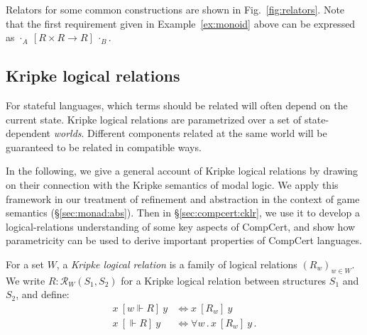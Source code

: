 \documentclass[acmsmall,timestamp,review,anonymous]{acmart}
\newcommand{\ifr}[1]{\ [{#1}]\ }
\begin{document}
Relators for some common constructions are shown in Fig.~\ref{fig:relators}.
Note that the first requirement given in Example~\ref{ex:monoid} above
can be expressed as
$
  \cdot_A \ifr{R \times R \rightarrow R} \cdot_B
$.



\subsection{Kripke logical relations} %
\label{sec:klr}

For stateful languages,
which terms should be related
will often depend on the current state.
Kripke logical relations
are parametrized over a set of state-dependent \emph{worlds}.
Different components related at the same world
will be guaranteed to be related in compatible ways.

In the following,
we give a general account of Kripke logical relations
by drawing on their connection with
the Kripke semantics of modal logic.
We apply this framework
in our treatment of refinement and abstraction
in the context of game semantics (\S\ref{sec:monad:abs}).
Then in \S\ref{sec:compcert:cklr},
we use it to develop a logical-relations
understanding of some key aspects of CompCert,
and show how parametricity
can be used to derive important properties
of CompCert languages.

\begin{definition}
For a set $W$,
a \emph{Kripke logical relation} is
a family of logical relations $(R_w)_{w \in W}$.
We write $R : \mathcal{R}_W(S_1, S_2)$
for a Kripke logical relation between structures $S_1$ and $S_2$,
and define:
\begin{align*}
  x \ifr{w \Vdash R} y &\Leftrightarrow x \ifr{R_w} y \\
  x \ifr{\Vdash R} y &\Leftrightarrow \forall w \,.\, x \ifr{R_w} y \,.
\end{align*}
\end{definition}
\end{document}
